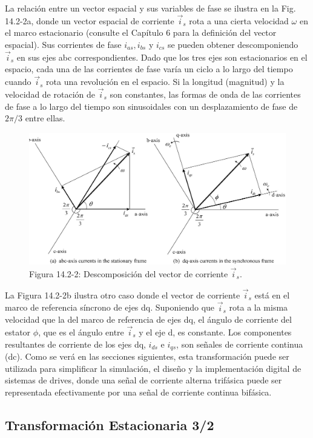 \documentclass[letterpaper,12pt]{article}
\begin{document}
La relación entre un vector espacial y sus variables de fase se ilustra en la Fig. 14.2-2a, donde un vector espacial de corriente $\vec{i}_s$ rota a una cierta velocidad $\omega$ en el marco estacionario (consulte el Capítulo 6 para la definición del vector espacial). Sus corrientes de fase $i_{as}, i_{bs}$ y $i_{cs}$ se pueden obtener descomponiendo $\vec{i}_s$ en sus ejes abc correspondientes. Dado que los tres ejes son estacionarios en el espacio, cada una de las corrientes de fase varía un ciclo a lo largo del tiempo cuando $\vec{i}_s$ rota una revolución en el espacio. Si la longitud (magnitud) y la velocidad de rotación de $\vec{i}_s$ son constantes, las formas de onda de las corrientes de fase a lo largo del tiempo son sinusoidales con un desplazamiento de fase de $2\pi/3$ entre ellas.

\begin{figure}[ht]
\centering
\includegraphics{graficos/img02.jpg}
\caption{Figura 14.2-2: Descomposición del vector de corriente $\vec{i}_s$.}
\end{figure}
\FloatBarrier

La Figura 14.2-2b ilustra otro caso donde el vector de corriente $\vec{i}_s$ está en el marco de referencia síncrono de ejes dq. Suponiendo que $\vec{i}_s$ rota a la misma velocidad que la del marco de referencia de ejes dq, el ángulo de corriente del estator $\phi$, que es el ángulo entre $\vec{i}_s$ y el eje d, es constante. Los componentes resultantes de corriente de los ejes dq, $i_{ds}$ e $i_{qs}$, son señales de corriente continua (dc). Como se verá en las secciones siguientes, esta transformación puede ser utilizada para simplificar la simulación, el diseño y la implementación digital de sistemas de drives, donde una señal de corriente alterna trifásica puede ser representada efectivamente por una señal de corriente continua bifásica.

\subsection{Transformación Estacionaria 3/2}
\end{document}
